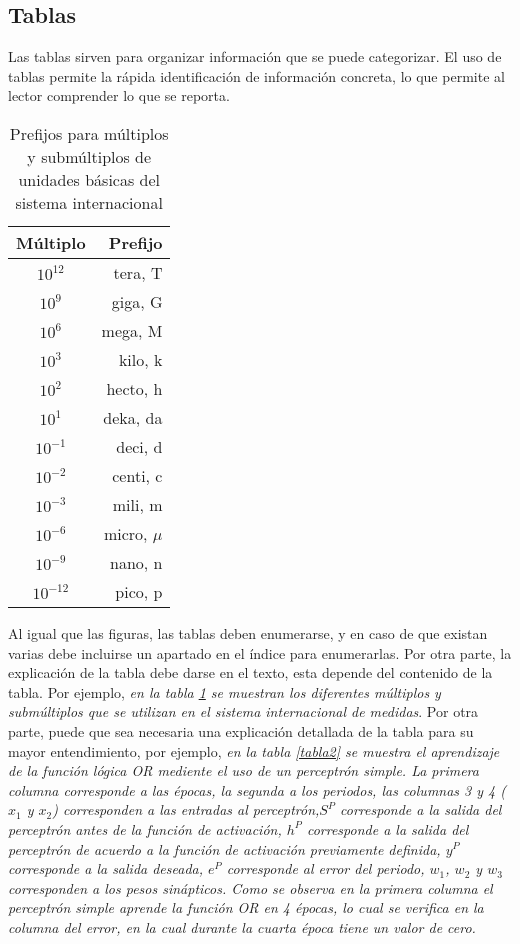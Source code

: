 \subsection{Tablas}

Las tablas sirven para organizar información que se puede categorizar. El uso de tablas permite la rápida identificación de información concreta, lo que permite al lector comprender lo que se reporta.

\begin{table}[!htbp]
\caption{Prefijos para múltiplos y submúltiplos de unidades básicas del sistema internacional}\label{tabla1}
\begin{center}
    \begin{tabular}{|c|r|}
    \hline
     Múltiplo & Prefijo \\\hline
     $10^{12}$ & tera, T\\\hline
     $10^{9}$ & giga, G\\\hline
     $10^{6}$ & mega, M\\\hline
     $10^{3}$ & kilo, k\\\hline
     $10^{2}$ & hecto, h\\\hline
     $10^{1}$ & deka, da\\\hline
     $10^{-1}$ & deci, d\\\hline
     $10^{-2}$ & centi, c\\\hline
     $10^{-3}$ & mili, m\\\hline
     $10^{-6}$ & micro, $\mu$\\\hline
     $10^{-9}$ & nano, n\\\hline
     $10^{-12}$ & pico, p\\\hline
    \end{tabular}
\end{center}
\end{table}

Al igual que las figuras, las tablas deben enumerarse, y en caso de que existan varias debe incluirse un apartado en el índice para enumerarlas. Por otra parte, la explicación de la tabla debe darse en el texto, esta depende del contenido de la tabla. Por ejemplo,\emph{ en la tabla \ref{tabla1} se muestran los diferentes múltiplos y submúltiplos que se utilizan en el sistema internacional de medidas}. Por otra parte, puede que sea necesaria una explicación detallada de la tabla para su mayor entendimiento, por ejemplo, \emph{en la tabla \ref{tabla2} se muestra el aprendizaje de la función lógica OR mediente el uso de un perceptrón simple. La primera columna corresponde a las épocas, la segunda a los periodos, las columnas 3 y 4 ($x_1$ y $x_2$) corresponden a las entradas al perceptrón,$S^P$ corresponde a la salida del perceptrón antes de la función de activación, $h^P$ corresponde a la salida del perceptrón de acuerdo a la función de activación previamente definida, $y^P$ corresponde a la salida deseada, $e^P$ corresponde al error del periodo, $w_1$, $w_2$ y $w_3$ corresponden a los pesos sinápticos. Como se observa en la primera columna el perceptrón simple aprende la función OR en 4 épocas, lo cual se verifica en la columna del error, en la cual durante la cuarta época tiene un valor de cero.}

